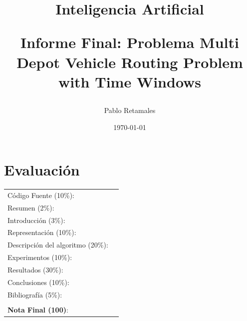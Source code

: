 \documentclass[letter, 10pt, dvipdfmx]{article}
\begin{document}
\title{Inteligencia Artificial \\ \begin{Large}Informe Final: Problema Multi Depot Vehicle Routing Problem with Time Windows \end{Large}}
\author{Pablo Retamales}
\date{\today}
\maketitle


\section*{Evaluaci\'on}

\begin{tabular}{ll}
C\'odigo Fuente (10\%): &  \underline{\hspace{2cm}}\\
Resumen (2\%):  & \underline{\hspace{2cm}} \\
Introducci\'on (3\%):  & \underline{\hspace{2cm}} \\
Representaci\'on (10\%):  & \underline{\hspace{2cm}} \\
Descripci\'on del algoritmo (20\%):  & \underline{\hspace{2cm}} \\
Experimentos (10\%):  & \underline{\hspace{2cm}} \\
Resultados (30\%):  & \underline{\hspace{2cm}} \\
Conclusiones (10\%): &  \underline{\hspace{2cm}}\\
Bibliograf\'ia (5\%): & \underline{\hspace{2cm}}\\
 &  \\
\textbf{Nota Final (100)}:   & \underline{\hspace{2cm}}
\end{tabular}
\end{document}
